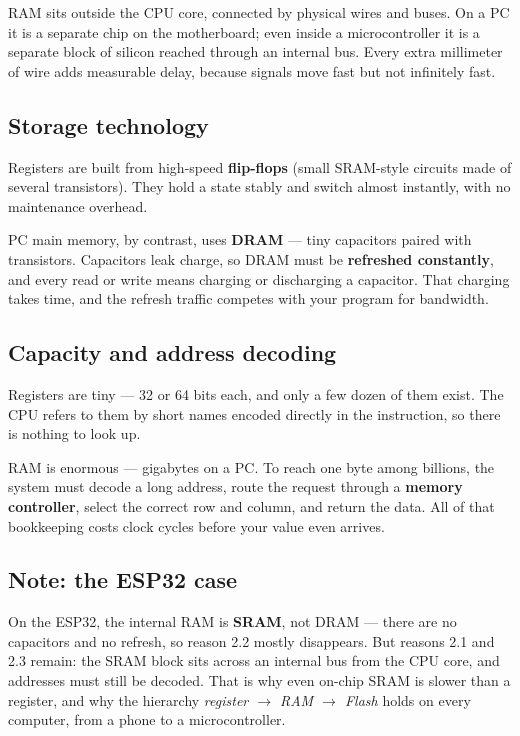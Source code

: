 \documentclass[11pt]{article}
\begin{document}
RAM sits outside the CPU core, connected by physical wires and buses. On a PC it is a separate chip on the motherboard; even inside a microcontroller it is a separate block of silicon reached through an internal bus. Every extra millimeter of wire adds measurable delay, because signals move fast but not infinitely fast.

\subsection{Storage technology}

Registers are built from high-speed \textbf{flip-flops} (small SRAM-style circuits made of several transistors). They hold a state stably and switch almost instantly, with no maintenance overhead.

PC main memory, by contrast, uses \textbf{DRAM} --- tiny capacitors paired with transistors. Capacitors leak charge, so DRAM must be \textbf{refreshed constantly}, and every read or write means charging or discharging a capacitor. That charging takes time, and the refresh traffic competes with your program for bandwidth.

\subsection{Capacity and address decoding}

Registers are tiny --- 32 or 64 bits each, and only a few dozen of them exist. The CPU refers to them by short names encoded directly in the instruction, so there is nothing to look up.

RAM is enormous --- gigabytes on a PC. To reach one byte among billions, the system must decode a long address, route the request through a \textbf{memory controller}, select the correct row and column, and return the data. All of that bookkeeping costs clock cycles before your value even arrives.

\subsection{Note: the ESP32 case}

On the ESP32, the internal RAM is \textbf{SRAM}, not DRAM --- there are no capacitors and no refresh, so reason 2.2 mostly disappears. But reasons 2.1 and 2.3 remain: the SRAM block sits across an internal bus from the CPU core, and addresses must still be decoded. That is why even on-chip SRAM is slower than a register, and why the hierarchy \emph{register $\rightarrow$ RAM $\rightarrow$ Flash} holds on every computer, from a phone to a microcontroller.
\end{document}
